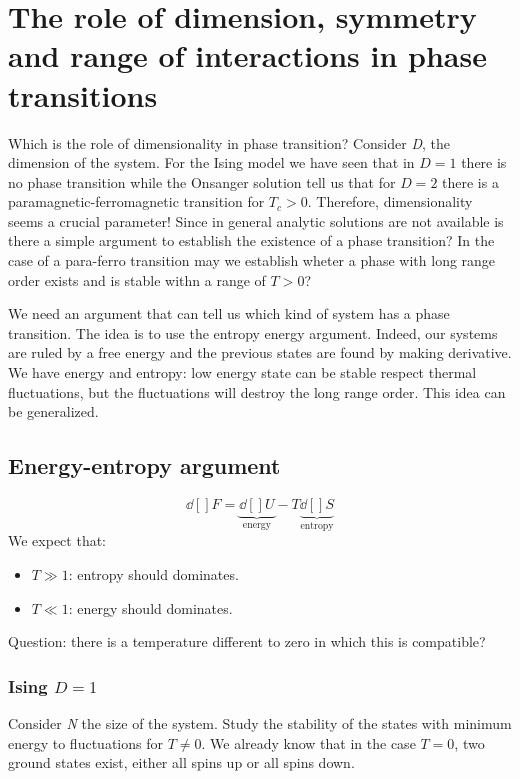 \documentclass[../main/main.tex]{subfiles}
\begin{document}
\chapter{The role of dimension, symmetry and range of interactions in phase transitions}




Which is the role of dimensionality in phase transition? Consider \emph{D}, the dimension of the system.
For the Ising model we have seen that in \( D=1 \) there is no phase transition while the Onsanger solution tell us that for \( D=2 \) there is a paramagnetic-ferromagnetic transition for \( T_c >0 \).
Therefore, dimensionality seems a crucial parameter!
Since in general analytic solutions are not available is there a simple argument to establish the existence of a phase transition?
In the case of a para-ferro transition may we establish wheter a phase with long range order exists and is stable withn a range of \( T>0 \)?

We need an argument that can tell us which kind of system has a phase transition. The idea is to use the entropy energy argument. Indeed, our systems are ruled by a free energy and the previous states are found by making derivative. We have energy and entropy: low energy state can be stable respect thermal fluctuations, but the fluctuations will destroy the long range order. This idea can be generalized.

\section{Energy-entropy argument}

\begin{equation}
  \dd[]{F} = \underbrace{\dd[]{U}}_{\text{energy}}  - T \underbrace{ \dd[]{S}}_{\text{entropy}}
\end{equation}
We expect that:
\begin{itemize}
\item \( T \gg 1\): entropy should dominates.
\item \( T \ll 1 \): energy should dominates.
\end{itemize}

\noindent Question: there is a temperature different to zero in which this is compatible?

\subsection{Ising \( D=1 \) }
Consider \emph{N} the size of the system.
Study the stability of the states with minimum energy to fluctuations for \( T \neq 0 \).
We already know that in the case \( T=0 \), two ground states exist, either all spins up or all spins down.
\end{document}
